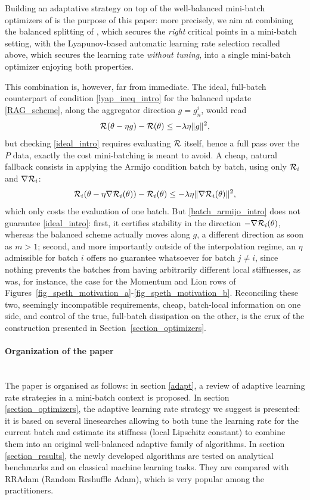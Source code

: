 Building an adaptative strategy on top of the well-balanced mini-batch
          optimizers of \cite{partI} is the purpose of this paper: more precisely, we aim at combining the balanced splitting of \cite{partI}, which secures the {\em right} critical points in a mini-batch setting, with the Lyapunov-based automatic learning rate selection recalled above, which secures the learning rate {\em without tuning}, into a single mini-batch optimizer enjoying both properties.

This combination is, however, far from immediate. The ideal, full-batch counterpart of condition \eqref{lyap_ineq_intro} for the balanced update \eqref{RAG_scheme}, along the aggregator direction $g=g_n^i$, would read
\begin{equation}
	\mathcal{R}(\theta-\eta g) - \mathcal{R}(\theta) \leq -\lambda \eta \|g\|^2,
	\label{ideal_intro}
\end{equation}
but checking \eqref{ideal_intro} requires evaluating $\mathcal{R}$ itself, hence a full pass over the $P$ data, exactly the cost mini-batching is meant to avoid. A cheap, natural fallback consists in applying the Armijo condition batch by batch, using only $\mathcal{R}_i$ and $\nabla \mathcal{R}_i$:
\begin{equation}
	\mathcal{R}_i(\theta-\eta \nabla \mathcal{R}_i(\theta)) - \mathcal{R}_i(\theta) \leq -\lambda \eta \|\nabla \mathcal{R}_i(\theta)\|^2,
	\label{batch_armijo_intro}
\end{equation}
which only costs the evaluation of one batch. But \eqref{batch_armijo_intro} does not guarantee \eqref{ideal_intro}: first, it certifies stability in the direction
$-\nabla \mathcal{R}_i(\theta)$, whereas the balanced scheme actually moves along $g$, a different direction as soon as $m>1$; second, and more importantly outside of the interpolation regime, an
$\eta$ admissible for batch $i$ offers no guarantee whatsoever for batch $j\neq i$, since nothing prevents the batches from having arbitrarily different local stiffnesses, as was,
for instance, the case for the Momentum and Lion rows of Figures~\ref{fig_speth_motivation_a}-\ref{fig_speth_motivation_b}. Reconciling these two, seemingly incompatible
requirements, cheap, batch-local information on one side, and control of the true, full-batch dissipation on the other, is the crux of the construction presented in Section~\ref{section_optimizers}.

\paragraph{Organization of the paper}
~~\\
The paper is organised as follows: in section \ref{adapt}, a review of adaptive learning rate strategies
in a mini-batch context 
is proposed. 
In section \ref{section_optimizers}, the adaptive learning rate strategy we suggest is presented: it is based on several linesearches allowing to both tune the learning rate for the
current batch and estimate its stiffness (local Lipschitz
constant) to combine them into an original well-balanced adaptive family of algorithms. 
In section \ref{section_results}, the newly developed algorithms are tested on analytical benchmarks and on classical machine learning tasks. They are compared with RRAdam (Random Reshuffle Adam), which is very popular among the practitioners.   


